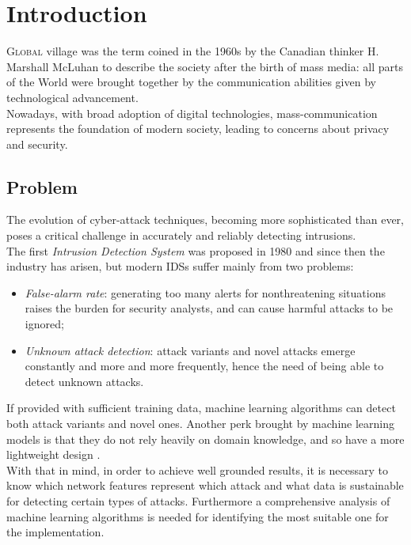 \chapter{Introduction}
\label{chap:intro}

\lettrine[lines=3, findent=3pt, nindent=0pt]{G}{lobal} village was the term coined in the 1960s by the Canadian thinker H. Marshall McLuhan \cite{mcluhan1962} to describe the society after the birth of mass media: all parts of the World were brought together by the communication abilities given by technological advancement. \\
Nowadays, with broad adoption of digital technologies, mass-communication represents the foundation of modern society, leading to concerns about privacy and security.




\section{Problem}
\label{sec:problem}

The evolution of cyber-attack techniques, becoming more sophisticated than ever, poses a critical challenge in accurately and reliably detecting intrusions.\\ The first \textit{Intrusion Detection System} was proposed in 1980 \cite{Andreson1980} and since then the industry has arisen, but modern IDSs suffer mainly from two problems:
\begin{itemize}
    \item[\faCaretRight] \textit{False-alarm rate}: generating too many alerts for nonthreatening situations raises the burden for security analysts, and can cause harmful attacks to be ignored;
    \item[\faCaretRight] \textit{Unknown attack detection}: attack variants and novel attacks emerge constantly and more and more frequently, hence the need of being able to detect unknown attacks.
\end{itemize}
If provided with sufficient training data, machine learning algorithms can detect both attack variants and novel ones. Another perk brought by machine learning models is that they do not rely heavily on domain knowledge, and so have a more lightweight design \cite{Liu2019}. \\ With that in mind, in order to achieve well grounded results, it is necessary to know which network features represent which attack and what data is sustainable for detecting certain types of attacks. Furthermore a comprehensive analysis of machine learning algorithms is needed for identifying the most suitable one for the implementation.


